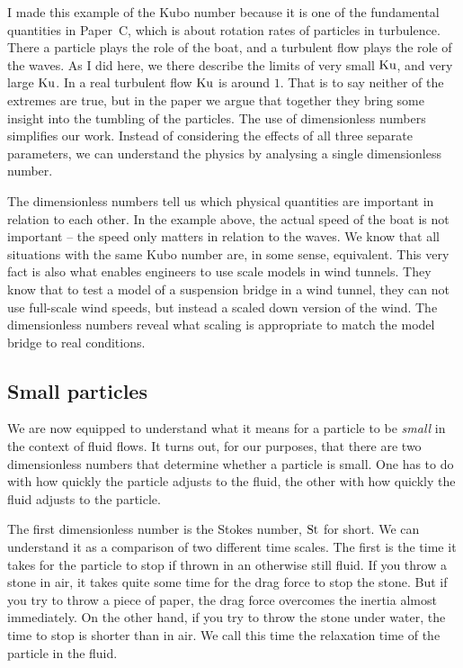 \documentclass[thesis.tex]{subfiles}
\begin{document}
I made this example of the Kubo number because it is one of the fundamental quantities in Paper~C, which is about rotation rates of particles in turbulence. There a particle plays the role of the boat, and a turbulent flow plays the role of the waves. As I did here, we there describe the limits of very small $\mbox{Ku}$, and very large $\mbox{Ku}$. In a real turbulent flow $\mbox{Ku}$ is around $1$. That is to say neither of the extremes are true, but in the paper we argue that together they bring some insight into the tumbling of the particles. The use of dimensionless numbers simplifies our work. Instead of considering the effects of all three separate parameters, we can understand the physics by analysing a single dimensionless number.

The dimensionless numbers tell us which physical quantities are important in relation to each other. In the example above, the actual speed of the boat is not important -- the speed only matters in relation to the waves. We know that all situations with the same Kubo number are, in some sense, equivalent. This very fact is also what enables engineers to use scale models in wind tunnels. They know that to test a model of a suspension bridge in a wind tunnel, they can not use full-scale wind speeds, but instead a scaled down version of the wind. The dimensionless numbers reveal what scaling is appropriate to match the model bridge to real conditions.

\subsection*{Small particles}

We are now equipped to understand what it means for a particle to be \emph{small} in the context of fluid flows. It turns out, for our purposes, that there are two dimensionless numbers that determine whether a particle is small. One has to do with how quickly the particle adjusts to the fluid, the other with how quickly the fluid adjusts to the particle.

The first dimensionless number is the Stokes number, $\mbox{St}$ for short. We can understand it as a comparison of two different time scales. The first is the time it takes for the particle to stop if thrown in an otherwise still fluid. If you throw a stone in air, it takes quite some time for the drag force to stop the stone. But if you try to throw a piece of paper, the drag force overcomes the inertia almost immediately. On the other hand, if you try to throw the stone under water, the time to stop is shorter than in air. We call this time the relaxation time of the particle in the fluid. 
\end{document}
